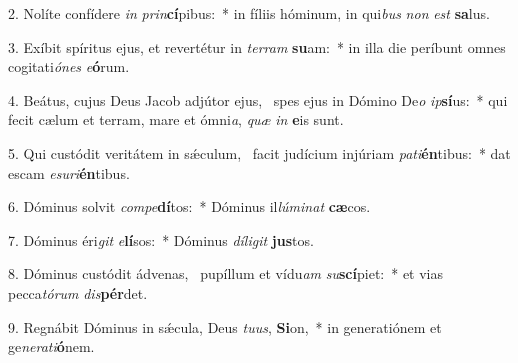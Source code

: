 2. Nolíte confídere \textit{in} \textit{prin}\textbf{cí}pibus:~*  in fíliis hóminum, in qui\textit{bus} \textit{non} \textit{est} \textbf{sa}lus.\

3. Exíbit spíritus ejus, et revertétur in \textit{ter}\textit{ram} \textbf{su}am:~*  in illa die períbunt omnes cogitati\textit{ó}\textit{nes} \textit{e}\textbf{ó}rum.\

4. Beátus, cujus Deus Jacob adjútor ejus, \dag\  spes ejus in Dómino De\textit{o} \textit{ip}\textbf{sí}us:~*  qui fecit cælum et terram, mare et ómni\textit{a}, \textit{quæ} \textit{in} \textbf{e}is sunt.\

5. Qui custódit veritátem in sǽculum, \dag\  facit judícium injúriam \textit{pa}\textit{ti}\textbf{én}tibus:~*  dat escam \textit{e}\textit{su}\textit{ri}\textbf{én}tibus.\

6. Dóminus solvit \textit{com}\textit{pe}\textbf{dí}tos:~*  Dóminus il\textit{lú}\textit{mi}\textit{nat} \textbf{cæ}cos.\

7. Dóminus éri\textit{git} \textit{e}\textbf{lí}sos:~*  Dóminus \textit{dí}\textit{li}\textit{git} \textbf{jus}tos.\

8. Dóminus custódit ádvenas, \dag\  pupíllum et vídu\textit{am} \textit{su}\textbf{scí}piet:~*  et vias pecca\textit{tó}\textit{rum} \textit{dis}\textbf{pér}det.\

9. Regnábit Dóminus in sǽcula, Deus \textit{tu}\textit{us}, \textbf{Si}on,~*  in generatiónem et ge\textit{ne}\textit{ra}\textit{ti}\textbf{ó}nem.\

